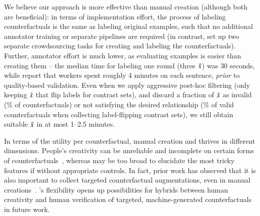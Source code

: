 We believe our approach is more effective than manual creation (although both are beneficial): in terms of implementation effort, the process of labeling counterfactuals is the same as labeling original examples, such that no additional annotator training or separate pipelines are required (in contrast, \citet{kaushik2019learning} set up two separate crowdsourcing tasks for creating and labeling the counterfactuals). 
Further, annotator effort is much lower, as evaluating examples is easier than creating them -- the median time for labeling one round (three $\hat{x}$) was $30$ seconds, while \citet{kaushik2019learning} report that workers spent roughly 4 minutes on each \nli sentence, \emph{prior} to quality-based validation.
Even when we apply aggressive post-hoc filtering (\eg only keeping $\hat{x}$ that flip labels for contrast sets), and discard a fraction of $\hat{x}$ as invalid (\% of \nli counterfactuals) or not satisfying the desired relationship (\% of valid \nli counterfactuals when collecting label-flipping contrast sets), we still obtain suitable $\hat{x}$ in at most 1--2.5 minutes.

In terms of the utility per counterfactual, manual creation and \sysname thrives in different dimensions. 
People's creativity can be unreliable and incomplete on certain forms of counterfactuals~\cite{ribeiro2018sear}, whereas \sysname may be too broad to elucidate the most tricky features if without appropriate controls.
In fact, prior work has observed that it is also important to collect targeted counterfactual augmentations, even in manual creations~\cite{longpre2020effective, Khashabi2020MoreBF}.
\sysname's flexibility opens up possibilities for hybrids between human creativity and human verification of targeted, machine-generated counterfactuals in future work.




